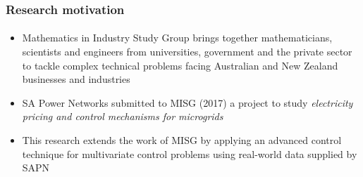 \documentclass[handout, smaller, xcolor=table]{beamer}			%
\begin{document}
\begin{frame}
	\frametitle{Research motivation}
	\framesubtitle{}

	\begin{minipage}{0.52\linewidth}
		\begin{itemize}
			\item  Mathematics in Industry Study Group brings together mathematicians, scientists and engineers from universities, government and the private sector to tackle complex technical problems facing Australian and New Zealand businesses and industries
		
			\item  SA Power Networks submitted to MISG (2017) a project to study \textit{electricity pricing and control mechanisms for microgrids}
		
			\item  This research extends the work of MISG by applying an advanced control technique for multivariate control problems using real-world data supplied by SAPN 
	
		\end{itemize}
	\end{minipage}%
	\begin{minipage}{0.48\linewidth}
	\end{minipage}

\end{frame}
\end{document}
